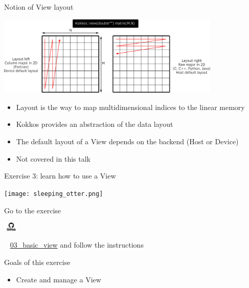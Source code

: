 \documentclass[aspectratio=169]{beamer}
\newcommand{\githublink}[2][2em]{%
    \hspace{-0.25em}%
    \parbox[c][#1][c]{#1}{%
        \includegraphics[width=#1]{GitHub-logo.png}%
    }%
    \hspace{-0.25em}%
    ~%
    #2%
}
\begin{document}

\begin{frame}{Notion of View layout}
    \begin{center}
        \includegraphics[width=0.8\textwidth]{layout_right_left.png}
    \end{center}
    \begin{itemize}
        \item Layout is the way to map multidimensional indices to the linear memory
        \item Kokkos provides an abstraction of the data layout
        \item The default layout of a View depends on the backend (Host or Device)
        \item Not covered in this talk
    \end{itemize}
\end{frame}


\begin{frame}{Exercise 3: learn how to use a View}
    \begin{center}
        \texttt{[image: sleeping\_otter.png]}
    \end{center}

    Go to the exercise \githublink{\href{https://github.com/CExA-project/cexa-kokkos-tutorials/tree/main/exercises/03_basic_view}{03\_basic\_view}} and follow the instructions

    \begin{block}{Goals of this exercise}
        \begin{itemize}
            \item Create and manage a View
        \end{itemize}
    \end{block}
\end{frame}

\end{document}

